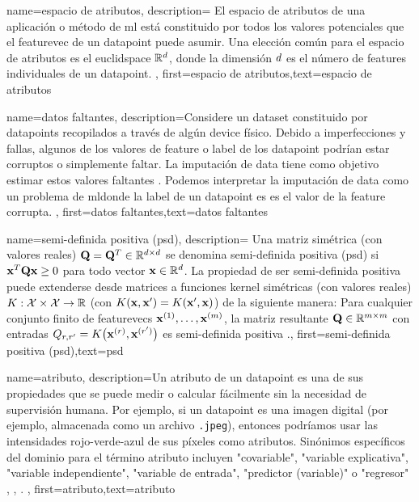 {name={espacio de atributos},
	description={
		El espacio de atributos de una aplicación o método de \gls{ml}
		está constituido por todos los valores potenciales que el \gls{featurevec} de un \gls{datapoint} puede asumir.
		Una elección común para el espacio de atributos es el \gls{euclidspace} $\mathbb{R}^{d}$, 
		donde la dimensión $d$ es el número de \gls{feature}s individuales de un \gls{datapoint}.
		},
	first={espacio de atributos},text={espacio de atributos}  
}


{name={datos faltantes},
	description={Considere un \gls{dataset} constituido por \gls{datapoint}s recopilados  
		a través de algún \gls{device} físico. Debido a imperfecciones y fallas, algunos de los valores de \gls{feature} 
		o \gls{label} de los \gls{datapoint} podrían estar corruptos o simplemente faltar.  
		La imputación de \Gls{data}  tiene como objetivo estimar estos valores faltantes \cite{Abayomi2008DiagnosticsFM}. 
		Podemos interpretar la imputación de \gls{data}  como un problema de \gls{ml}donde la \gls{label} de un \gls{datapoint} es 
		es el valor de la \gls{feature}  corrupta. 
		},
	first={datos faltantes},text={datos faltantes}  
}


{name={semi-definida positiva (psd)},
    description=
    {Una  matriz simétrica (con valores reales) $\mathbf{Q} = \mathbf{Q}^{T} \in \mathbb{R}^{d \times d}$ 
	se denomina semi-definida positiva (psd) si ${\bf x}^{T} \mathbf{Q} {\bf x} \geq 0$ para todo vector ${\bf x} \in \mathbb{R}^{d}$. 
	La propiedad de ser semi-definida positiva puede extenderse desde matrices a funciones \gls{kernel} simétricas (con valores reales) 
	$K: \mathcal{X} \times \mathcal{X} \rightarrow \mathbb{R}$ 
	(con $K({\bf x},{\bf x}') = K({\bf x}',{\bf x})$)
	de la siguiente manera: Para cualquier conjunto finito de \gls{featurevec}s ${\bf x}^{(1)},\dots,{\bf x}^{(m)}$, 
	la matriz resultante $\mathbf{Q} \in \mathbb{R}^{m \times m}$ con 
	entradas $Q_{r,r'} = K\big({\bf x}^{(r)},{\bf x}^{(r')}\big)$ 
	es semi-definida positiva \cite{LearningKernelsBook}.},
    first={semi-definida positiva (psd)},text={psd}  
}

{name={atributo},
	description={Un atributo de un \gls{datapoint} es una de sus propiedades que se puede 
		medir o calcular fácilmente sin la necesidad de supervisión humana. Por ejemplo, si un \gls{datapoint} 
		es una imagen digital (por ejemplo, almacenada como un archivo \texttt{.jpeg}), entonces podríamos usar
		las intensidades rojo-verde-azul de sus píxeles como atributos. Sinónimos específicos del dominio  
		para el término atributo incluyen "covariable", "variable explicativa", "variable independiente", "variable de entrada", "predictor (variable)" o "regresor" \cite{Gujarati2021}, \cite{Dodge2003}, \cite{Everitt2022}. 
		}, first={atributo},text={atributo}  
}

